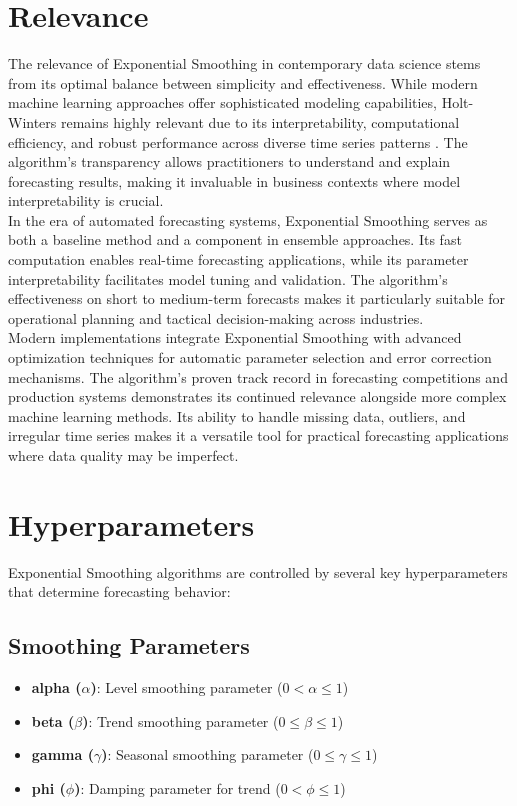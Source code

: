 \section{Relevance}
\label{sec:relevance}

The relevance of Exponential Smoothing in contemporary data science stems from its optimal balance between simplicity and effectiveness. While modern machine learning approaches offer sophisticated modeling capabilities, Holt-Winters remains highly relevant due to its interpretability, computational efficiency, and robust performance across diverse time series patterns \cite{Gardner:2006}. The algorithm's transparency allows practitioners to understand and explain forecasting results, making it invaluable in business contexts where model interpretability is crucial.\\

In the era of automated forecasting systems, Exponential Smoothing serves as both a baseline method and a component in ensemble approaches. Its fast computation enables real-time forecasting applications, while its parameter interpretability facilitates model tuning and validation. The algorithm's effectiveness on short to medium-term forecasts makes it particularly suitable for operational planning and tactical decision-making across industries.\\

Modern implementations integrate Exponential Smoothing with advanced optimization techniques for automatic parameter selection and error correction mechanisms. The algorithm's proven track record in forecasting competitions and production systems demonstrates its continued relevance alongside more complex machine learning methods. Its ability to handle missing data, outliers, and irregular time series makes it a versatile tool for practical forecasting applications where data quality may be imperfect.

\section{Hyperparameters}
\label{sec:hyperparameters}

Exponential Smoothing algorithms are controlled by several key hyperparameters that determine forecasting behavior:

\subsection{Smoothing Parameters}
\begin{itemize}
	\item \textbf{alpha ($\alpha$)}: Level smoothing parameter ($0 < \alpha \leq 1$)
	\item \textbf{beta ($\beta$)}: Trend smoothing parameter ($0 \leq \beta \leq 1$)
	\item \textbf{gamma ($\gamma$)}: Seasonal smoothing parameter ($0 \leq \gamma \leq 1$)
	\item \textbf{phi ($\phi$)}: Damping parameter for trend ($0 < \phi \leq 1$)
\end{itemize}

